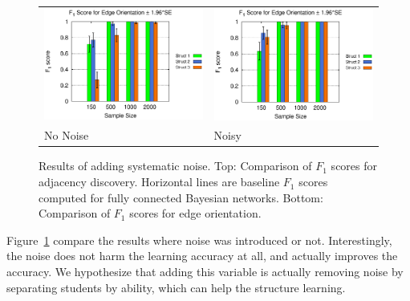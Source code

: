 \documentclass{edm_template}
\newcommand{\hl}[1]{\colorbox{yellow}{#1}}
\begin{document}
{\begin{figure}[!ht]
\begin{center}
\begin{tabular}{>{\centering}m{1.5in} >{\centering\arraybackslash}m{1.5in}}
						\includegraphics[width=1.1\linewidth]{figures/F1O_single.eps} &\includegraphics[width=1.1\linewidth]{figures/F1O_single_noisy.eps}\\
						No Noise & Noisy
					\end{tabular}
				\end{center}
				\caption{Results of adding systematic noise. Top: Comparison of $F_1$ scores for adjacency discovery. Horizontal lines are baseline $F_1$ scores computed for fully connected Bayesian networks. Bottom: Comparison of $F_1$ scores for edge orientation. }
				\label{fig:f1-noisy} 
			\end{figure}
	
	Figure~\ref{fig:f1-noisy} compare the results where noise was introduced or not.
	Interestingly, the noise does not harm the learning accuracy at all, and actually improves the accuracy.
	We hypothesize that adding this variable is actually removing noise by separating students by ability, which can help the structure learning.

}
\end{document}
